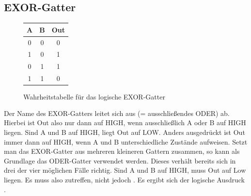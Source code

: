 \subsection{EXOR-Gatter} \label{EXOR}
\begin{figure}[h]
	\centering
	\hspace{1cm}
	\begin{tabular}{|c|c|c|}
		\hline
		\textbf{A} & \textbf{B} & \textbf{Out} \\
		\hline
		0 & 0 & 0 \\
		1 & 0 & 1 \\
		0 & 1 & 1 \\
		1 & 1 & 0 \\
		\hline
	\end{tabular}
	\caption{Wahrheitstabelle für das logische EXOR-Gatter}
\end{figure}
Der Name des EXOR-Gatters leitet sich aus  (= ausschließendes ODER) ab. Hierbei ist Out also nur dann auf HIGH, wenn ausschließlich A oder B auf HIGH liegen. Sind A und B auf HIGH, liegt Out auf LOW. Anders ausgedrückt ist Out immer dann auf HIGH, wenn A und B unterschiedliche Zustände aufweisen. Setzt man das EXOR-Gatter aus mehreren kleineren Gattern zusammen, so kann als Grundlage das ODER-Gatter verwendet werden. Dieses verhält bereits sich in drei der vier möglichen Fälle richtig. Sind A und B auf HIGH, muss Out auf Low liegen. Es muss also  zutreffen, nicht jedoch . Es ergibt sich der logische Ausdruck .\\
